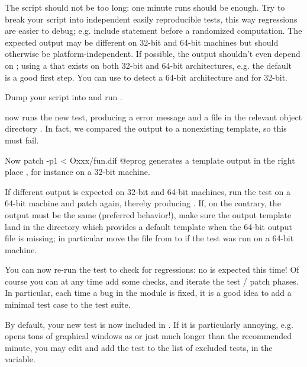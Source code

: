 {\item The script should not be too long: one minute runs should be enough.
Try to break your script into independent easily reproducible tests, this way
regressions are easier to debug; e.g. include  statement before
a randomized computation. The expected output may be different on 32-bit and
64-bit machines but should otherwise be platform-independent. If possible, the
output shouldn't even depend on ; using a 
that exists on both 32-bit and 64-bit architectures, e.g. the
default~ is a good first step. You can use
 to detect a 64-bit architecture and
 for 32-bit.

\item Dump your script into  and run .

\item {} now runs the new test, producing a \kbd{[BUG]} error
message and a  file in the relevant object directory .
In fact, we compared the output to a nonexisting template, so this must fail.

\item Now
\bprog
  patch -p1 < Oxxx/fun.dif
@eprog\noindent
generates a template output in the right place , for
instance on a 32-bit machine.

\item If different output is expected on 32-bit and 64-bit machines, run the
test on a 64-bit machine and patch again, thereby
producing . If, on the contrary, the output must be the
same (preferred behavior!), make sure the output template land in the
 directory which provides a default template when the
64-bit output file is missing; in particular move the file from
 to  if the test was run on a 64-bit
machine.

\item You can now re-run the test to check for regressions: no \kbd{[BUG]}
is expected this time! Of course you can at any time add some checks, and
iterate the test / patch phases. In particular, each time a bug in the
 module is fixed, it is a good idea to add a minimal test case to
the test suite.

\item By default, your new test is now included in . If
it is particularly annoying, e.g. opens tons of graphical windows as
 or just much longer than the recommended minute, you
may edit  and add the  test to the list of
excluded tests, in the  variable.

}
